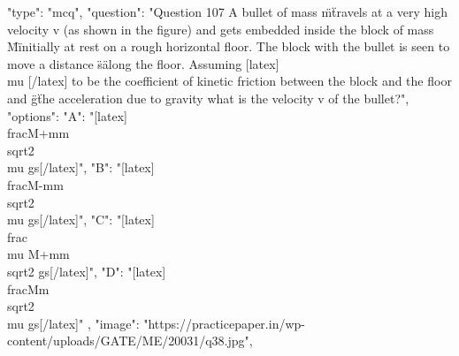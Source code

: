   {
    "type": "mcq",
    "question": "Question 107 A bullet of mass \"m\" travels at a very high velocity v (as shown in the figure) and gets embedded inside the block of mass \"M\" initially at rest on a rough horizontal floor. The block with the bullet is seen to move a distance \"s\" along the floor. Assuming [latex] \\mu [/latex]  to be the coefficient of kinetic friction between the block and the floor and \"g\" the acceleration due to gravity what is the velocity v of the bullet?",
    "options": {
      "A": "[latex]\\frac{M+m}{m}\\sqrt{2\\mu gs}[/latex]",
      "B": "[latex]\\frac{M-m}{m}\\sqrt{2\\mu gs}[/latex]",
      "C": "[latex]\\frac{\\mu M+m}{m}\\sqrt{2 gs}[/latex]",
      "D": "[latex]\\frac{M}{m}\\sqrt{2\\mu gs}[/latex]"
    },
    "image": "https://practicepaper.in/wp-content/uploads/GATE/ME/20031/q38.jpg",
}

